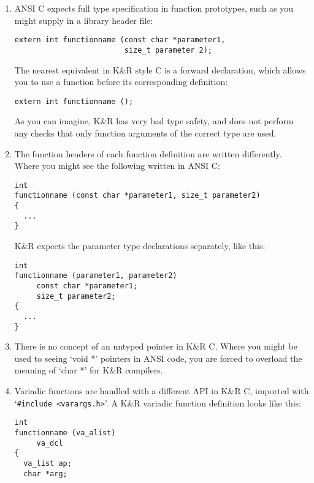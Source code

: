 \begin{enumerate}
\item ANSI C expects full type specification in function prototypes, such as 
you might supply in a library header file:

\begin{Verbatim}[frame=single]
extern int functionname (const char *parameter1,
                         size_t parameter 2);
\end{Verbatim}

The nearest equivalent in K\&R style C is a forward declaration, which 
allows you to use a function before its corresponding definition: 

\begin{Verbatim}[frame=single]
extern int functionname ();
\end{Verbatim}

As you can imagine, K\&R has very bad type safety, and does not perform any checks that only function arguments of the correct type are used. 


\item The function headers of each function definition are written differently. Where you might see the following written in ANSI C: 

\begin{Verbatim}[frame=single]
int
functionname (const char *parameter1, size_t parameter2)
{
  ...
}
\end{Verbatim}



K\&R expects the parameter type declarations separately, like this: 

\begin{Verbatim}[frame=single]
int
functionname (parameter1, parameter2)
     const char *parameter1;
     size_t parameter2;
{
  ...
}
\end{Verbatim}

\item There is no concept of an untyped pointer in K\&R C. Where you might be used to seeing `void *' pointers in ANSI code, you are forced to overload the meaning of `char *' for K\&R compilers. 

\item Variadic functions are handled with a different API in K\&R C,
imported with `\verb+#include <varargs.h>+'. A K\&R variadic function definition looks like this:

\begin{Verbatim}[frame=single]
int
functionname (va_alist)
     va_dcl
{
  va_list ap;
  char *arg;


\end{Verbatim}
\end{enumerate}
